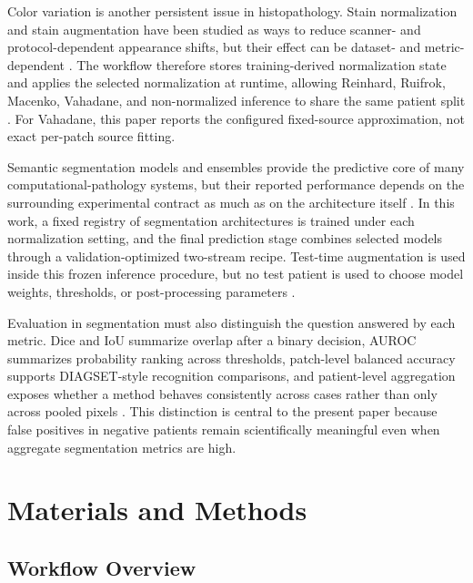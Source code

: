 \documentclass[a4paper,fleqn]{cas-dc}
\begin{document}
Color variation is another persistent issue in histopathology. Stain normalization and stain augmentation have been studied as ways to reduce scanner- and protocol-dependent appearance shifts, but their effect can be dataset- and metric-dependent \cite{tellez2019augmentation}. The workflow therefore stores training-derived normalization state and applies the selected normalization at runtime, allowing Reinhard, Ruifrok, Macenko, Vahadane, and non-normalized inference to share the same patient split \cite{reinhard2001color,ruifrok2001quantification,macenko2009method,vahadane2016structure}. For Vahadane, this paper reports the configured fixed-source approximation, not exact per-patch source fitting.

Semantic segmentation models and ensembles provide the predictive core of many computational-pathology systems, but their reported performance depends on the surrounding experimental contract as much as on the architecture itself \cite{khened2021generalized,dietterich2000ensemble,caruana2004ensemble}. In this work, a fixed registry of segmentation architectures is trained under each normalization setting, and the final prediction stage combines selected models through a validation-optimized two-stream recipe. Test-time augmentation is used inside this frozen inference procedure, but no test patient is used to choose model weights, thresholds, or post-processing parameters \cite{moshkov2020test}.

Evaluation in segmentation must also distinguish the question answered by each metric. Dice and IoU summarize overlap after a binary decision, AUROC summarizes probability ranking across thresholds, patch-level balanced accuracy supports DIAGSET-style recognition comparisons, and patient-level aggregation exposes whether a method behaves consistently across cases rather than only across pooled pixels \cite{saito2015precision,fawcett2006roc,seghier2024dice,sokolova2009performance}. This distinction is central to the present paper because false positives in negative patients remain scientifically meaningful even when aggregate segmentation metrics are high.

\section{Materials and Methods}

\subsection{Workflow Overview}
\end{document}
